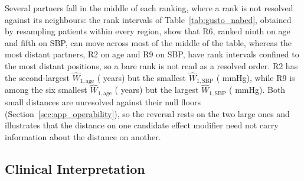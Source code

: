 \documentclass[AMA,Times1COL]{WileyNJDv5}
\begin{document}
Several partners fall in the middle of each ranking, where a rank is not resolved against its neighbours: the rank intervals of Table~\ref{tab:gusto_nabcd}, obtained by resampling patients within every region, show that R6, ranked ninth on age and fifth on SBP, can move across most of the middle of the table, whereas the most distant partners, R2 on age and R9 on SBP, have rank intervals confined to the most distant positions, so a bare rank is not read as a resolved order. R2 has the second-largest $\widehat{W}_{1,\text{age}}$ ( years) but the smallest $\widehat{W}_{1,\text{SBP}}$ ( mmHg), while R9 is among the six smallest $\widehat{W}_{1,\text{age}}$ ( years) but the largest $\widehat{W}_{1,\text{SBP}}$ ( mmHg). Both small distances are unresolved against their null floors (Section~\ref{sec:app_operability}), so the reversal rests on the two large ones and illustrates that the distance on one candidate effect modifier need not carry information about the distance on another.

\subsection{Clinical Interpretation}\label{sec:app_clinical}

\end{document}
